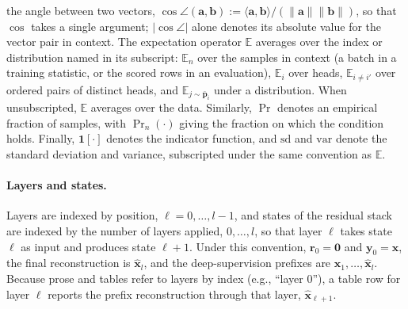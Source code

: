 the angle between two vectors,
$\cos\angle(\mathbf{a}, \mathbf{b}) :=
\langle\mathbf{a},\mathbf{b}\rangle / (\lVert\mathbf{a}\rVert\lVert\mathbf{b}\rVert)$,
so that $\cos$ takes a single argument; $\lvert\cos\angle\rvert$ alone
denotes its absolute value for the vector pair in context. The expectation
operator $\mathbb{E}$ averages over the index or distribution named in its
subscript: $\mathbb{E}_n$ over the samples in context (a batch in a
training statistic, or the scored rows in an evaluation), $\mathbb{E}_i$
over heads, $\mathbb{E}_{i \neq i'}$ over ordered pairs of distinct heads,
and $\mathbb{E}_{j \sim \bar{\mathbf{p}}_i}$ under a distribution. When
unsubscripted, $\mathbb{E}$ averages over the data. Similarly, $\Pr$
denotes an empirical fraction of samples, with $\Pr_n(\cdot)$ giving the
fraction on which the condition holds. Finally, $\mathbf{1}[\cdot]$ denotes
the indicator function, and $\mathrm{sd}$ and $\mathrm{var}$ denote the
standard deviation and variance, subscripted under the same convention as
$\mathbb{E}$.

\paragraph{Layers and states.}
Layers are indexed by position, $\ell = 0,\dots,l-1$, and states of the
residual stack are indexed by the number of layers applied, $0,\dots,l$, so
that layer $\ell$ takes state $\ell$ as input and produces state $\ell+1$.
Under this convention, $\mathbf{r}_0 = \mathbf{0}$ and
$\mathbf{y}_0 = \mathbf{x}$, the final reconstruction is
$\hat{\mathbf{x}}_l$, and the deep-supervision prefixes are
$\hat{\mathbf{x}}_1,\dots,\hat{\mathbf{x}}_l$. Because prose and tables
refer to layers by index (e.g., ``layer 0''), a table row for layer $\ell$
reports the prefix reconstruction through that layer,
$\hat{\mathbf{x}}_{\ell+1}$.

